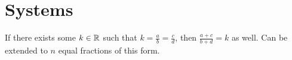 \section{Systems}

\begin{definition}
    If there exists some $k\in \mathbb{R}$ such that $k=\frac{a}{b}=\frac{c}{d}$, then $\frac{a+c}{b+d}=k$ as well.
    Can be extended to $n$ equal fractions of this form.
\end{definition}